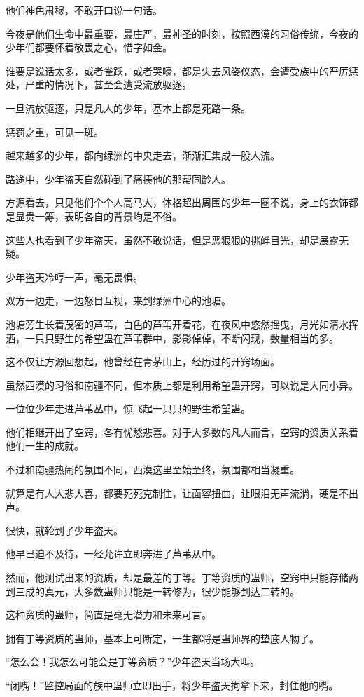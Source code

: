 \begin{this_body}
他们神色肃穆，不敢开口说一句话。

今夜是他们生命中最重要，最庄严，最神圣的时刻，按照西漠的习俗传统，今夜的少年们都要怀着敬畏之心，惜字如金。

谁要是说话太多，或者雀跃，或者哭嚎，都是失去风姿仪态，会遭受族中的严厉惩处，严重的情况下，甚至会遭受流放驱逐。

一旦流放驱逐，只是凡人的少年，基本上都是死路一条。

惩罚之重，可见一斑。

越来越多的少年，都向绿洲的中央走去，渐渐汇集成一股人流。

路途中，少年盗天自然碰到了痛揍他的那帮同龄人。

方源看去，只见他们个个人高马大，体格超出周围的少年一圈不说，身上的衣饰都是显贵一筹，表明各自的背景均是不俗。

这些人也看到了少年盗天，虽然不敢说话，但是恶狠狠的挑衅目光，却是展露无疑。

少年盗天冷哼一声，毫无畏惧。

双方一边走，一边怒目互视，来到绿洲中心的池塘。

池塘旁生长着茂密的芦苇，白色的芦苇开着花，在夜风中悠然摇曳，月光如清水挥洒，一只只野生的希望蛊在芦苇群中，影影倬倬，不断闪现，数量相当的多。

这不仅让方源回想起，他曾经在青茅山上，经历过的开窍场面。

虽然西漠的习俗和南疆不同，但本质上都是利用希望蛊开窍，可以说是大同小异。

一位位少年走进芦苇丛中，惊飞起一只只的野生希望蛊。

他们相继开出了空窍，各有忧愁悲喜。对于大多数的凡人而言，空窍的资质关系着他们一生的成就。

不过和南疆热闹的氛围不同，西漠这里至始至终，氛围都相当凝重。

就算是有人大悲大喜，都要死死克制住，让面容扭曲，让眼泪无声流淌，硬是不出声。

很快，就轮到了少年盗天。

他早已迫不及待，一经允许立即奔进了芦苇从中。

然而，他测试出来的资质，却是最差的丁等。丁等资质的蛊师，空窍中只能存储两到三成的真元，大多数蛊师只能是一转修为，很少能够到达二转的。

这种资质的蛊师，简直是毫无潜力和未来可言。

拥有丁等资质的蛊师，基本上可断定，一生都将是蛊师界的垫底人物了。

“怎么会！我怎么可能会是丁等资质？”少年盗天当场大叫。

“闭嘴！”监控局面的族中蛊师立即出手，将少年盗天拘拿下来，封住他的嘴。


\end{this_body}
